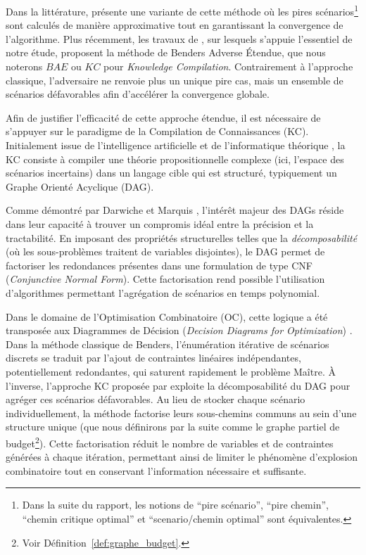 \documentclass[12pt, a4paper, twoside]{article}
\numberwithin{equation}{section}
\begin{document}
	Dans la littérature, \cite{PATZOLD202020} présente une variante de cette méthode où les pires scénarios\footnote{Dans la suite du rapport, les notions de \enquote{pire scénario}, \enquote{pire chemin}, \enquote{chemin critique optimal} et \enquote{scenario/chemin optimal} sont équivalentes.} sont calculés de manière approximative tout en garantissant la convergence de l'algorithme. Plus récemment, les travaux de \cite{portoleauROADEF}, sur lesquels s'appuie l'essentiel de notre étude, proposent la méthode de  Benders Adverse Étendue, que nous noterons $BAE$ ou $KC$ pour \textit{Knowledge Compilation}. Contrairement à l'approche classique, l'adversaire ne renvoie plus un unique pire cas, mais un ensemble de scénarios défavorables afin d'accélérer la convergence globale. 

    Afin de justifier l'efficacité de cette approche étendue, il est nécessaire de s'appuyer sur le paradigme de la Compilation de Connaissances (KC). Initialement issue de l'intelligence artificielle et de l'informatique théorique \cite{Darwiche_2002}, la KC consiste à compiler une théorie propositionnelle complexe (ici, l'espace des scénarios incertains) dans un langage cible qui est structuré, typiquement un Graphe Orienté Acyclique (DAG). 
    
    Comme démontré par Darwiche et Marquis \cite{Darwiche_2002}, l'intérêt majeur des DAGs réside dans leur capacité à trouver un compromis idéal entre la précision et la tractabilité. En imposant des propriétés structurelles telles que la \textit{décomposabilité} (où les sous-problèmes traitent de variables disjointes), le DAG permet de factoriser les redondances présentes dans une formulation de type CNF (\textit{Conjunctive Normal Form}). Cette factorisation rend possible l'utilisation d'algorithmes permettant l'agrégation de scénarios en temps polynomial. %
    
    Dans le domaine de l'Optimisation Combinatoire (OC), cette logique a été transposée aux Diagrammes de Décision (\textit{Decision Diagrams for Optimization}) \cite{bergman2016decision}. Dans la méthode classique de Benders, l'énumération itérative de scénarios discrets se traduit par l'ajout de contraintes linéaires indépendantes, potentiellement redondantes, qui saturent rapidement le problème Maître. À l'inverse, l'approche KC proposée par \cite{portoleauTHESIS} exploite la décomposabilité du DAG pour agréger ces scénarios défavorables. Au lieu de stocker chaque scénario individuellement, la méthode factorise leurs sous-chemins communs au sein d'une structure unique (que nous définirons par la suite comme le graphe partiel de budget\footnote{Voir Définition~\ref{def:graphe_budget}.}). Cette factorisation réduit le nombre de variables et de contraintes générées à chaque itération, permettant ainsi de limiter le phénomène d’explosion combinatoire tout en conservant l'information nécessaire et suffisante.
    
\end{document}
